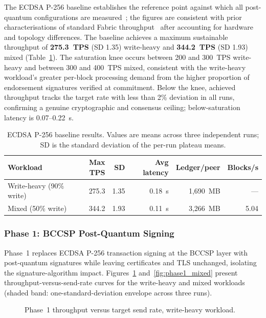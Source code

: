 \documentclass{ieeetj}
\begin{document}
The ECDSA P-256 baseline establishes the reference point against which all
post-quantum configurations are measured~\cite{androulaki2018}; the figures are
consistent with prior characterisations of standard Fabric
throughput~\cite{baliga2018performance, kuzlu2021performance, nasir2018} after
accounting for hardware and topology differences. The baseline achieves a maximum
sustainable throughput of \textbf{275.3~TPS} (SD 1.35) write-heavy and
\textbf{344.2~TPS} (SD 1.93) mixed (Table~\ref{tab:ecdsa_baseline}). The
saturation knee occurs between 200 and 300~TPS write-heavy and between 300 and
400~TPS mixed, consistent with the write-heavy workload's greater per-block
processing demand from the higher proportion of endorsement signatures verified
at commitment. Below the knee, achieved throughput tracks the target rate with
less than 2\% deviation in all runs, confirming a genuine cryptographic and
consensus ceiling; below-saturation latency is 0.07--0.22~s.

\begin{table}[ht]
\centering
\caption{ECDSA P-256 baseline results. Values are means across three independent
runs; SD is the standard deviation of the per-run plateau means.}
\label{tab:ecdsa_baseline}
\setlength{\tabcolsep}{3.5pt}
\begin{tabular}{@{}lrrrrr@{}}
\toprule
\textbf{Workload} & \textbf{Max TPS} & \textbf{SD} &
\textbf{Avg latency} & \textbf{Ledger/peer} & \textbf{Blocks/s} \\
\midrule
Write-heavy (90\% write) & 275.3 & 1.35 & 0.18~s & 1,690~MB & — \\
Mixed (50\% write)       & 344.2 & 1.93 & 0.11~s & 3,266~MB & 5.04 \\
\bottomrule
\end{tabular}
\end{table}

\subsubsection{Phase 1: BCCSP Post-Quantum Signing}

Phase~1 replaces ECDSA P-256 transaction signing at the BCCSP layer with
post-quantum signatures while leaving certificates and TLS unchanged, isolating
the signature-algorithm impact. Figures~\ref{fig:phase1_write}
and~\ref{fig:phase1_mixed} present throughput-versus-send-rate curves for the
write-heavy and mixed workloads (shaded band: one-standard-deviation envelope
across three runs).

\begin{figure}[ht]
\centering

\caption{Phase~1 throughput versus target send rate, write-heavy workload.}
\label{fig:phase1_write}
\end{figure}
\end{document}
